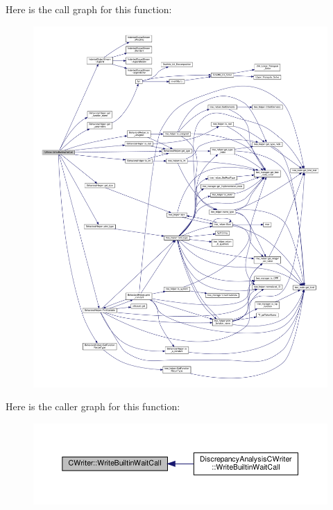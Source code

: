 Here is the call graph for this function\+:
\nopagebreak
\begin{figure}[H]
\begin{center}
\leavevmode
\includegraphics[width=350pt]{d3/d59/classCWriter_ad3407e20cd7eb648efe844771d3fe80f_cgraph}
\end{center}
\end{figure}
Here is the caller graph for this function\+:
\nopagebreak
\begin{figure}[H]
\begin{center}
\leavevmode
\includegraphics[width=350pt]{d3/d59/classCWriter_ad3407e20cd7eb648efe844771d3fe80f_icgraph}
\end{center}
\end{figure}
\mbox{\label{classCWriter_ad526446c6dd856accaca4a90b3a64f25}} 

